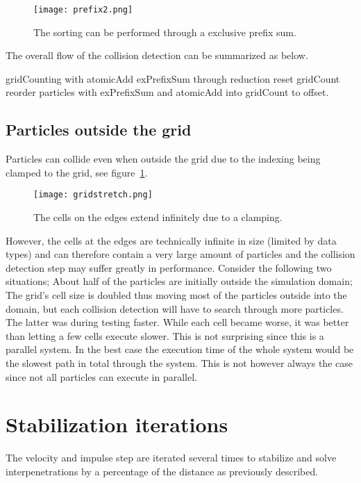 \begin{figure}[H]
  \centering
  \texttt{[image: prefix2.png]}
  \caption{The sorting can be performed through a exclusive prefix sum.}
\end{figure}

The overall flow of the collision detection can be summarized as below.

\begin{algorithm}[H]
  \begin{algorithmic}[1]
  \State gridCounting with atomicAdd
  \State exPrefixSum through reduction
  \State reset gridCount
  \State reorder particles with exPrefixSum and atomicAdd into gridCount to offset.
  \end{algorithmic}
\end{algorithm}

\subsection{Particles outside the grid}
Particles can collide even when outside the grid due to the indexing
being clamped to the grid, see figure~\ref{fig:gridStretch}.

\begin{figure}[H]
  \centering
  \texttt{[image: gridstretch.png]}
  \caption{The cells on the edges extend infinitely due to a clamping.\label{fig:gridStretch}}
\end{figure}

However, the cells at the edges are technically infinite
in size (limited by data types) and can therefore contain a very large amount of particles and the collision
detection step may suffer greatly in performance. Consider the following two situations;
About half of the particles are initially outside the simulation domain; The grid's
cell size is doubled thus moving most of the particles outside into the domain, but
each collision detection will have to search through more particles.
The latter was during testing faster. While each cell became worse, it was better
than letting a few cells execute slower. This is not surprising since this is a
parallel system. In the best case the execution time of the whole system would be
the slowest path in total through the system. This is not however always the case
since not all particles can execute in parallel.

\section{Stabilization iterations} \label{sec:stabil}
The velocity and impulse step are iterated several times to stabilize and solve
interpenetrations by a percentage of the distance as previously described.

